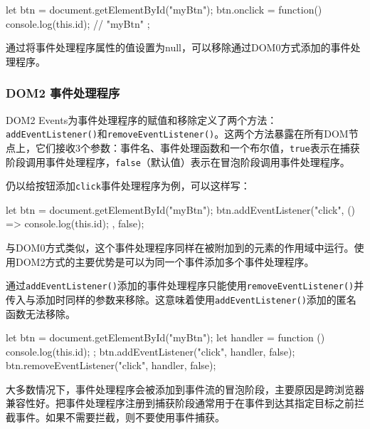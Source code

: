 \begin{JavaScript}
let btn = document.getElementById("myBtn"); 
btn.onclick = function() {  
    console.log(this.id);  // "myBtn" 
}; 
\end{JavaScript}

通过将事件处理程序属性的值设置为null，可以移除通过DOM0方式添加的事件处理程序。

\subsubsection*{DOM2 事件处理程序}

DOM2  Events为事件处理程序的赋值和移除定义了两个方法：\texttt{addEventListener()}和\texttt{removeEventListener()}。这两个方法暴露在所有DOM节点上，它们接收3个参数：事件名、事件处理函数和一个布尔值，\texttt{true}表示在捕获阶段调用事件处理程序，\texttt{false}（默认值）表示在冒泡阶段调用事件处理程序。

仍以给按钮添加\texttt{click}事件处理程序为例，可以这样写：

\begin{JavaScript}
let btn = document.getElementById("myBtn"); 
btn.addEventListener("click", () => {   
    console.log(this.id); 
}, false); 
\end{JavaScript}

与DOM0方式类似，这个事件处理程序同样在被附加到的元素的作用域中运行。使用DOM2方式的主要优势是可以为同一个事件添加多个事件处理程序。

通过\texttt{addEventListener()}添加的事件处理程序只能使用\texttt{removeEventListener()}并传入与添加时同样的参数来移除。这意味着使用\texttt{addEventListener()}添加的匿名函数无法移除。

\begin{JavaScript}
let btn = document.getElementById("myBtn");
let handler = function () {
    console.log(this.id);
};
btn.addEventListener("click", handler, false);
btn.removeEventListener("click", handler, false);
\end{JavaScript}

大多数情况下，事件处理程序会被添加到事件流的冒泡阶段，主要原因是跨浏览器兼容性好。把事件处理程序注册到捕获阶段通常用于在事件到达其指定目标之前拦截事件。如果不需要拦截，则不要使用事件捕获。
